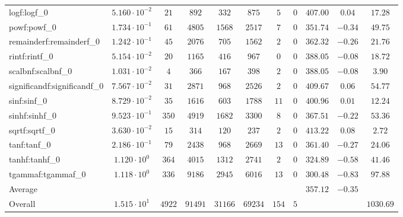 \begin{tabular}{|l|c|c|c|c|c|c|c|c|c|c|}
logf:logf\_0                 & $ 5.160 \cdot 10^{-2} $ & $ 21     $ & $ 892   $ & $ 332   $ & $ 875   $ & $ 5   $ & $ 0 $ & $ 407.00      $ & $ 0.04    $ & $ 17.28   $ \\
powf:powf\_0                 & $ 1.734 \cdot 10^{-1} $ & $ 61     $ & $ 4805  $ & $ 1568  $ & $ 2517  $ & $ 7   $ & $ 0 $ & $ 351.74      $ & $ -0.34   $ & $ 49.75   $ \\
remainderf:remainderf\_0     & $ 1.242 \cdot 10^{-1} $ & $ 45     $ & $ 2076  $ & $ 705   $ & $ 1562  $ & $ 2   $ & $ 0 $ & $ 362.32      $ & $ -0.26   $ & $ 21.76   $ \\
rintf:rintf\_0               & $ 5.154 \cdot 10^{-2} $ & $ 20     $ & $ 1165  $ & $ 416   $ & $ 967   $ & $ 0   $ & $ 0 $ & $ 388.05      $ & $ -0.08   $ & $ 18.72   $ \\
scalbnf:scalbnf\_0           & $ 1.031 \cdot 10^{-2} $ & $ 4      $ & $ 366   $ & $ 167   $ & $ 398   $ & $ 2   $ & $ 0 $ & $ 388.05      $ & $ -0.08   $ & $ 3.90    $ \\
significandf:significandf\_0 & $ 7.567 \cdot 10^{-2} $ & $ 31     $ & $ 2871  $ & $ 968   $ & $ 2526  $ & $ 2   $ & $ 0 $ & $ 409.67      $ & $ 0.06    $ & $ 54.77   $ \\
sinf:sinf\_0                 & $ 8.729 \cdot 10^{-2} $ & $ 35     $ & $ 1616  $ & $ 603   $ & $ 1788  $ & $ 11  $ & $ 0 $ & $ 400.96      $ & $ 0.01    $ & $ 12.24   $ \\
sinhf:sinhf\_0               & $ 9.523 \cdot 10^{-1} $ & $ 350    $ & $ 4919  $ & $ 1682  $ & $ 3300  $ & $ 8   $ & $ 0 $ & $ 367.51      $ & $ -0.22   $ & $ 53.36   $ \\
sqrtf:sqrtf\_0               & $ 3.630 \cdot 10^{-2} $ & $ 15     $ & $ 314   $ & $ 120   $ & $ 237   $ & $ 2   $ & $ 0 $ & $ 413.22      $ & $ 0.08    $ & $ 2.72    $ \\
tanf:tanf\_0                 & $ 2.186 \cdot 10^{-1} $ & $ 79     $ & $ 2438  $ & $ 968   $ & $ 2669  $ & $ 13  $ & $ 0 $ & $ 361.40      $ & $ -0.27   $ & $ 24.06   $ \\
tanhf:tanhf\_0               & $ 1.120 \cdot 10^{0}  $ & $ 364    $ & $ 4015  $ & $ 1312  $ & $ 2741  $ & $ 2   $ & $ 0 $ & $ 324.89      $ & $ -0.58   $ & $ 41.46   $ \\
tgammaf:tgammaf\_0           & $ 1.118 \cdot 10^{0}  $ & $ 336    $ & $ 9186  $ & $ 2945  $ & $ 6016  $ & $ 13  $ & $ 0 $ & $ 300.48      $ & $ -0.83   $ & $ 97.88   $ \\
\hline
Average                      & $                     $ & $        $ & $       $ & $       $ & $       $ & $     $ & $   $ & $ 357.12      $ & $ -0.35   $ & $         $ \\
\hline
Overall                      & $ 1.515 \cdot 10^{1}  $ & $ 4922   $ & $ 91491 $ & $ 31166 $ & $ 69234 $ & $ 154 $ & $ 5 $ & $             $ & $         $ & $ 1030.69 $ \\
\hline
\end{tabular}
